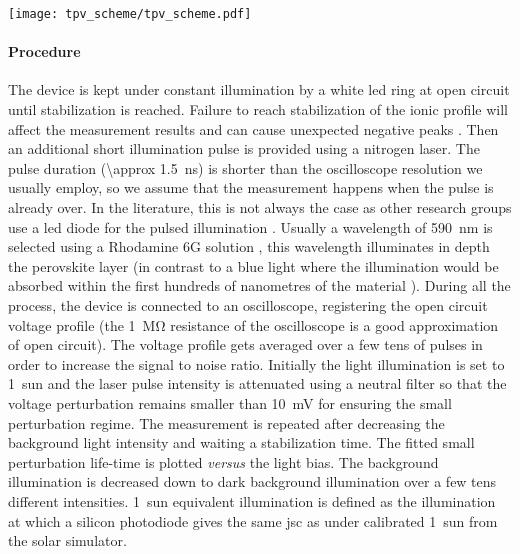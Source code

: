 \begin{SCfigure}
	\centering
	\texttt{[image: tpv\_scheme/tpv\_scheme.pdf]}
	\label{fig:tpv_scheme}
\end{SCfigure}

	\paragraph{Procedure}
	The device is kept under constant illumination by a white \gls{led} ring at open circuit until stabilization is reached.
	Failure to reach stabilization of the ionic profile will affect the measurement results \cite{ORegan2015b} and can cause unexpected negative  peaks \cite{Calado2016}.
	Then an additional short illumination pulse is provided using a nitrogen laser.
	The pulse duration (\SI{\approx 1.5}{\ns}) is shorter than the oscilloscope resolution we usually employ, so we assume that the measurement happens when the pulse is already over.
	In the literature, this is not always the case as other research groups use a \gls{led} diode for the pulsed illumination \cite{Calado2016}.
	Usually a wavelength of \SI{590}{\nm} is selected using a Rhodamine 6G solution \cite{RadiantDyesLaser}, this wavelength illuminates in depth the perovskite layer (in contrast to a blue light where the illumination would be absorbed within the first hundreds of nanometres of the material \cite{Bi2016,Tress2016}).
	During all the process, the device is connected to an oscilloscope, registering the open circuit voltage profile (the \SI{1}{\Mohm} resistance of the oscilloscope is a good approximation of open circuit).
	The voltage profile gets averaged over a few tens of pulses in order to increase the signal to noise ratio.
	Initially the light illumination is set to \SI{1}{sun} and the laser pulse intensity is attenuated using a neutral filter so that the voltage perturbation remains smaller than \SI{10}{\mV} for ensuring the small perturbation regime.
	The measurement is repeated after decreasing the background light intensity and waiting a stabilization time.
	The fitted small perturbation life-time is plotted \textsl{versus} the light bias.
	The background illumination is decreased down to dark background illumination over a few tens different intensities.
	1~sun equivalent illumination is defined as the illumination at which a silicon photodiode gives the same \gls{jsc} as under calibrated 1~sun from the solar simulator.

